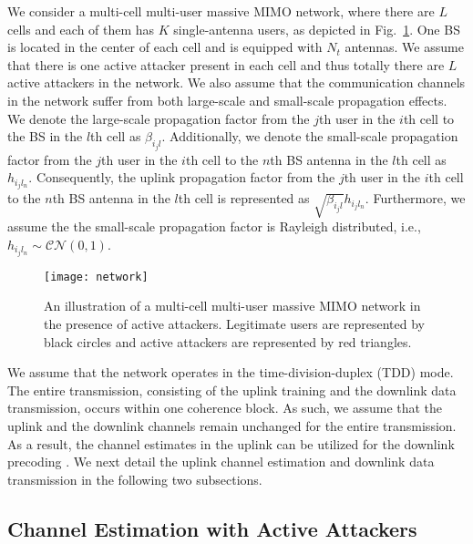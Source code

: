 \documentclass[conference]{IEEEtran}
\begin{document}
We consider a multi-cell multi-user massive MIMO network, where there are $L$ cells and each of them has $K$ single-antenna users, as depicted in Fig.~\ref{network}. One BS is located in the center of each cell and is equipped with $N_{t}$ antennas. We assume that there is one active attacker present in each cell and thus totally there are $L$ active attackers in the network. We also assume that the communication channels in the network suffer from both large-scale and small-scale propagation effects. We denote the large-scale propagation factor from the $j$th user in the $i$th cell to the BS in the $l$th cell as $\beta_{i_{j}l}$. Additionally, we denote the small-scale propagation factor from the $j$th user in the $i$th cell to the $n$th BS antenna in the $l$th cell as $h_{i_{j}l_{n}}$. Consequently, the uplink propagation factor from the $j$th user in the $i$th cell to the $n$th BS antenna in the $l$th cell is represented as $\sqrt{\beta_{i_{j}l}}h_{i_{j}l_{n}}$. Furthermore, we assume the the small-scale propagation factor is Rayleigh distributed, i.e., $h_{i_{j}l_{n}}\sim\mathcal{CN}(0,1)$.
\begin{figure}[!t]
\centering
\texttt{[image: network]}
\caption{An illustration of a multi-cell multi-user massive MIMO network in the presence of active attackers. Legitimate users are represented by black circles and active attackers are represented by red triangles. }
\label{network}
\end{figure}
We assume that the network operates in the time-division-duplex (TDD) mode. The entire transmission, consisting of the uplink training and the downlink data transmission, occurs within one coherence block. As such, we assume that the uplink and the downlink channels remain unchanged for the entire transmission. As a result, the channel estimates in the uplink can be utilized for the downlink precoding \cite{Lu2014,Rusek2013}. We next detail the uplink channel estimation and downlink data transmission in the following two subsections.

\subsection{Channel Estimation with Active Attackers}
\end{document}
